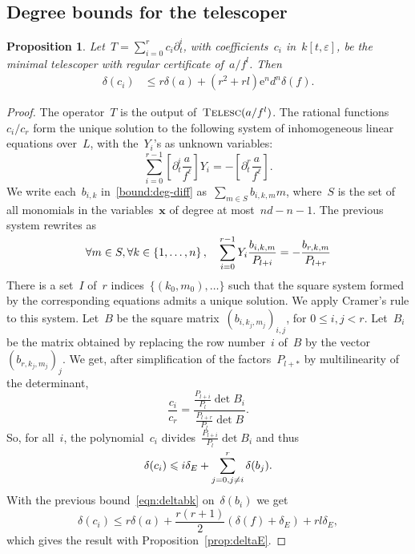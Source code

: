 \documentclass{sig-alternate}
\newtheorem{prop}[thm]{Proposition}
\newcommand{\tCreatTel}{\textsc{Telesc}}
\newcommand{\CreatTel}{\mathop{\textsc{\tCreatTel}}}
\newcommand{\xx}{\mathbf{x}}
\def\le{\leqslant}
\newcommand{\eexp}{\mathrm{e}}
\begin{document}
\subsection{Degree bounds for the telescoper}
\begin{prop}\label{thm:delta-ck}
  Let~$T=\sum_{i=0}^{r}c_i \partial_t^i$, with coefficients~$c_i$ in~$k[t,\varepsilon]$, be the minimal telescoper with regular certificate of~$a/f^l$.
Then
  \begin{align*}
  \delta(c_i) &\leqslant r\delta(a) + \left( r^2 + rl  \right)  \eexp^{n} d^n\delta(f).
  \end{align*}
\end{prop}

\begin{proof}
The operator~$T$ is the output of~$\CreatTel(a/f^l)$.
The rational functions~$c_i/c_r$ form the unique solution to the following system of inhomogeneous linear equations over~$L$, with the~$Y_i$'s as unknown variables:
\[ \sum_{i=0}^{r-1} \left[ \partial_t^i\frac{a}{f^\ell} \right] Y_i = - \left[ \partial_t^r\frac{a}{f^\ell} \right]. \]
We write each~$b_{i,k}$ in~\eqref{bound:deg-diff} as~$\sum_{m\in S}b_{i,k,m} m$, where~$S$ is the set of all monomials in the variables~$\xx$ of degree at most~$nd-n-1$.
The previous system rewrites as
\[  \forall m\in S, \forall k \in \left\{ 1,\dots,n \right\},\quad \sum_{i=0}^{\smash{r-1}} Y_i \frac{b_{i,k,m}}{P_{l+i}} = -\frac{b_{r,k,m}}{P_{l+r}} \]
There is a set~$I$ of~$r$ indices~$\{ (k_0,m_0),\dotsc \}$ such that the square system formed by the corresponding equations admits a unique solution.
We apply Cramer's rule to this system.
Let~$B$ be the square matrix~$(b_{i,k_j,m_j})_{i,j}$, for $0\le i,j<r$.
Let~$B_i$ be the matrix obtained by replacing the row number~$i$ of~$B$ by the vector~$(b_{r,k_j,m_j})_j$.
We get, after simplification of the factors~$P_{l+*}$ by multilinearity of the determinant,
\begin{equation}\label{eqn:cr-div-det}
  \frac{c_i}{c_r} =\frac{ \tfrac{P_{l+i}}{P_l} \det B_i }{\tfrac{P_{l+r}}{P_l} \det B}.
\end{equation}
So, for all~$i$, the polynomial~$c_i$ divides~$\tfrac{P_{l+i}}{P_l} \det B_i$ and thus
\begin{equation*}
  \delta(c_i) \leqslant i\delta_E + \sum_{j=0, j\neq i}^{\smash{r}} \delta(b_j).
\end{equation*}
With the previous bound~\eqref{eqn:deltabk} on~$\delta(b_i)$ we get
\[  \delta(c_i) \leqslant r\delta(a) + \frac{r(r+1)}{2}\left( \delta(f)+\delta_E \right) + rl \delta_E, \]
which gives the result with Proposition~\ref{prop:deltaE}.
\end{proof}
\end{document}

